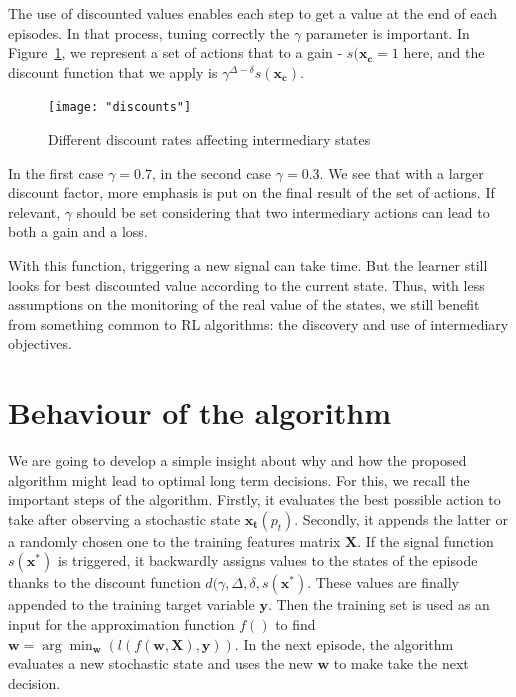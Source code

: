 \documentclass[letterpaper, 10.5 pt, conference]{ieeeconf}
\newcommand{\B}[1]{\mathbf{#1}}
\begin{document}
The use of discounted values enables each step to get a value at the end of each episodes. In that process, tuning correctly the $\gamma$ parameter is important. In Figure~\ref{fig:discounts}, we represent a set of actions that to a gain - $s(\B{x_c} = 1$ here, and the discount function that we apply is $\gamma^{\Delta-\delta}s(\B{x_c})$.

\begin{figure}
\begin{center}
\texttt{[image: "discounts"]}
\caption{Different discount rates affecting intermediary states}
\label{fig:discounts}
\end{center}
\end{figure}

In the first case $\gamma=0.7$, in the second case $\gamma=0.3$. We see that with a larger discount factor, more emphasis is put on the final result of the set of actions. If relevant, $\gamma$ should be set considering that two intermediary actions can lead to both a gain and a loss.

With this function, triggering a new signal can take time. But the learner still looks for best discounted value according to the current state. Thus, with less assumptions on the monitoring of the real value of the states, we still benefit from something common to RL algorithms: the discovery and use of intermediary objectives.

\section{Behaviour of the algorithm}

We are going to develop a simple insight about why and how the proposed algorithm might lead to optimal long term decisions. For this, we recall the important steps of the algorithm. Firstly, it evaluates the best possible action to take after observing a stochastic state $\B{x_t}(p_t)$. Secondly, it appends the latter or a randomly chosen one to the training features matrix $\B{X}$. If the signal function $s(\B{x^*})$ is triggered, it backwardly assigns values to the states of the episode thanks to the discount function $d(\gamma, \Delta, \delta, s(\B{x^*})$. These values are finally appended to the training target variable $\B{y}$. Then the training set is used as an input for the approximation function $f()$ to find $\B{w} = \arg\min_{\B{w}}(l(f(\B{w},\B{X}),\B{y}))$. In the next episode, the algorithm evaluates a new stochastic state and uses the new $\B{w}$ to make take the next decision.
\end{document}
